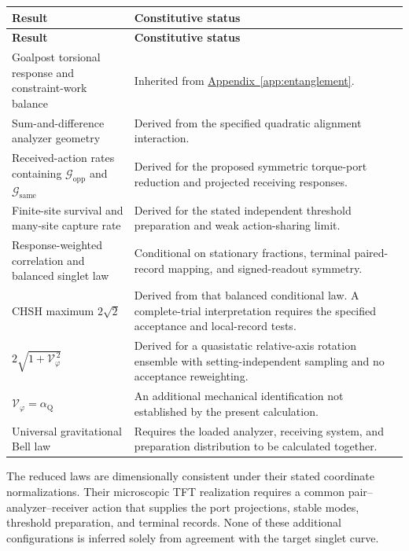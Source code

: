 \begingroup
\small
\renewcommand{\arraystretch}{1.22}
\setlength{\tabcolsep}{5pt}
\begin{longtable}{@{}>{\raggedright\arraybackslash}p{}>{\raggedright\arraybackslash}p{}@{}}
\toprule
\textbf{Result} & \textbf{Constitutive status}\\
\midrule
\endfirsthead
\toprule
\textbf{Result} & \textbf{Constitutive status}\\
\midrule
\endhead
\bottomrule
\endfoot
Goalpost torsional response and constraint-work balance
& Inherited from \hyperref[app:entanglement]{Appendix~\ref*{app:entanglement}}.\\
\addlinespace
Sum-and-difference analyzer geometry
& Derived from the specified quadratic alignment interaction.\\
\addlinespace
Received-action rates containing $\mathcal G_{\mathrm{opp}}$ and $\mathcal G_{\mathrm{same}}$
& Derived for the proposed symmetric torque-port reduction and projected receiving responses.\\
\addlinespace
Finite-site survival and many-site capture rate
& Derived for the stated independent threshold preparation and weak action-sharing limit.\\
\addlinespace
Response-weighted correlation and balanced singlet law
& Conditional on stationary fractions, terminal paired-record mapping, and signed-readout symmetry.\\
\addlinespace
CHSH maximum $2\sqrt2$
& Derived from that balanced conditional law. A complete-trial interpretation requires the specified acceptance and local-record tests.\\
\addlinespace
$2\sqrt{1+\mathcal V_\varphi^{\,2}}$
& Derived for a quasistatic relative-axis rotation ensemble with setting-independent sampling and no acceptance reweighting.\\
\addlinespace
$\mathcal V_\varphi=\alpha_{\mathrm Q}$
& An additional mechanical identification not established by the present calculation.\\
\addlinespace
Universal gravitational Bell law
& Requires the loaded analyzer, receiving system, and preparation distribution to be calculated together.\\
\end{longtable}
\endgroup

The reduced laws are dimensionally consistent under their stated coordinate normalizations. Their microscopic TFT realization requires a common pair--analyzer--receiver action that supplies the port projections, stable modes, threshold preparation, and terminal records. None of these additional configurations is inferred solely from agreement with the target singlet curve.

